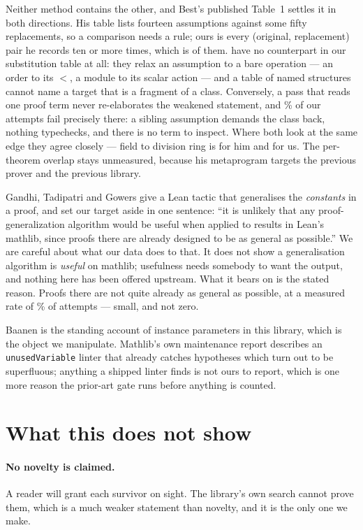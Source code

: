 \documentclass[11pt]{article}
\begin{document}
Neither method contains the other, and Best's published Table~1 settles it in
both directions. His table lists fourteen assumptions against some fifty
replacements, so a comparison needs a rule; ours is every (original,
replacement) pair he records ten or more times, which is \bestTop{} of them.
\bestMissing{} have no counterpart in our substitution table at all: they relax
an assumption to a bare operation --- an order to its \(<\), a module to its
scalar action --- and a table of named structures cannot name a target that is a
fragment of a class. Conversely, a pass that reads one proof term never
re-elaborates the weakened statement, and \incoherentPercent{}\% of our attempts
fail precisely there: a sibling assumption demands the class back, nothing
typechecks, and there is no term to inspect. Where both look at the same edge
they agree closely --- field to division ring is \bestFieldDR{} for him and
\ourFieldDR{} for us. The per-theorem overlap stays unmeasured, because his
metaprogram targets the previous prover and the previous library.

Gandhi, Tadipatri and Gowers \cite{gandhi2025} give a Lean tactic that
generalises the \emph{constants} in a proof, and set our target aside in one
sentence: ``it is unlikely that any proof-generalization algorithm would be
useful when applied to results in Lean's mathlib, since proofs there are already
designed to be as general as possible.'' We are careful about what our data does
to that. It does not show a generalisation algorithm is \emph{useful} on
mathlib; usefulness needs somebody to want the output, and nothing here has been
offered upstream. What it bears on is the stated reason. Proofs there are not
quite already as general as possible, at a measured rate of \ourYield{}\% of
attempts --- small, and not zero.

Baanen \cite{baanen2022} is the standing account of instance parameters in this
library, which is the object we manipulate. Mathlib's own maintenance report
\cite{baanen2025} describes an \texttt{unusedVariable} linter that already
catches hypotheses which turn out to be superfluous; anything a shipped linter
finds is not ours to report, which is one more reason the prior-art gate runs
before anything is counted.

\section{What this does not show}\label{sec:limits}

\paragraph{No novelty is claimed.} A reader will grant each survivor on sight.
The library's own search cannot prove them, which is a much weaker statement
than novelty, and it is the only one we make.
\end{document}
